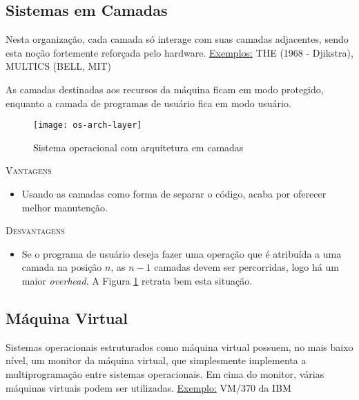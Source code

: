 \subsection{Sistemas em Camadas}
Nesta organização, cada camada só interage com suas camadas adjacentes, sendo esta noção fortemente reforçada pelo hardware.
\underline{Exemplos:} THE (1968 - Djikstra), MULTICS (BELL, MIT)

As camadas destinadas aos recursos da máquina ficam em modo protegido, enquanto a camada de programas de usuário fica em modo usuário.

\begin{figure}[ht]
  \centering
  \texttt{[image: os-arch-layer]}
  \caption{Sistema operacional com arquitetura em camadas}
  \label{fig:os-arch-layer}
\end{figure}

\textsc{Vantagens}
\begin{itemize}
  \item Usando as camadas como forma de separar o código, acaba por oferecer melhor manutenção.
\end{itemize}

\textsc{Desvantagens}
\begin{itemize}
  \item Se o programa de usuário deseja fazer uma operação que é atribuída a uma camada na posição $n$, as $n-1$ camadas devem ser percorridas, logo há um maior \textit{overhead}. A Figura \ref{fig:os-arch-layer} retrata bem esta situação.
\end{itemize}









\subsection{Máquina Virtual}
Sistemas operacionais estruturados como máquina virtual possuem, no mais baixo nível, um monitor da máquina virtual, que simplesmente implementa a multiprogramação entre sistemas operacionais. Em cima do monitor, várias máquinas virtuais podem ser utilizadas.
\underline{Exemplo:} VM/370 da IBM

